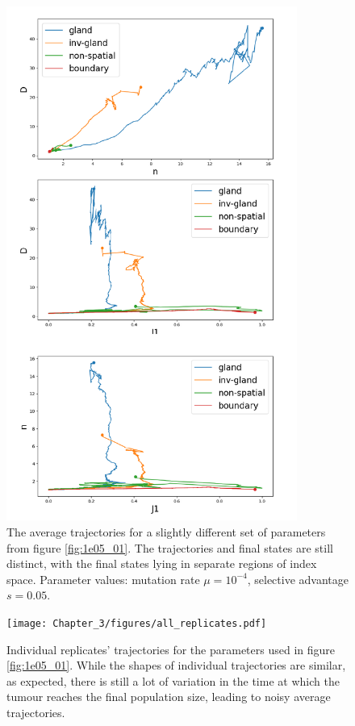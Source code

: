 \begin{figure}[h!]
    \centering
    \includegraphics[width=0.85\textwidth]{Chapter_3/figures/1e04005.pdf}
    \caption{The average trajectories for a slightly different set of
    parameters from figure \ref{fig:1e05_01}. The trajectories and final states
    are still distinct, with the final states lying in separate regions of
    index space. Parameter values: mutation rate $\mu = 10^{-4}$, selective
    advantage $s = 0.05$.}
    \label{fig:1e04_005}
\end{figure}

\begin{figure}[h!]
    \centering
    \texttt{[image: Chapter\_3/figures/all\_replicates.pdf]}
    \caption{Individual replicates' trajectories for the parameters used in
    figure \ref{fig:1e05_01}. While the shapes of individual trajectories are
    similar, as expected, there is still a lot of variation in the time at
    which the tumour reaches the final population size, leading to noisy
    average trajectories.}
    \label{fig:old_trajs}
\end{figure}
\clearpage

